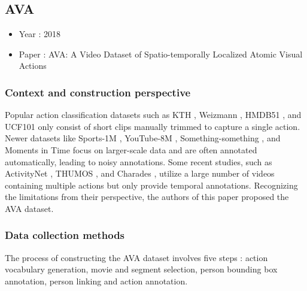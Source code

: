 \documentclass[10pt,onecolumn,letterpaper]{article}
\begin{document}
\subsection{AVA}

\begin{itemize}
	\item Year : 2018
	\item Paper : AVA: A Video Dataset of Spatio-temporally Localized Atomic Visual
	Actions \cite{AVA}
\end{itemize}

\subsubsection{\textbf{Context and construction perspective}}

Popular action classification datasets such as KTH \cite{KTH}, Weizmann
\cite{Weizmann}, HMDB51 \cite{HMDB51}, and UCF101 \cite{UCF101} only consist of
short clips manually trimmed to capture a single action. Newer datasets like
Sports-1M \cite{Sports1M}, YouTube-8M \cite{YouTube8M}, Something-something
\cite{somethingsomething}, and Moments in Time \cite{momentsintime} focus on
larger-scale data and are often annotated automatically, leading to noisy
annotations. Some recent studies, such as ActivityNet \cite{ActivityNet}, THUMOS
\cite{THUMOS}, and Charades \cite{Charades}, utilize a large number of videos
containing multiple actions but only provide temporal annotations. Recognizing
the limitations from their perspective, the authors of this paper proposed the
AVA dataset.

\subsubsection{Data collection methods}

The process of constructing the AVA dataset involves five steps : action
vocabulary generation, movie and segment selection, person bounding box
annotation, person linking and action annotation.
\end{document}

